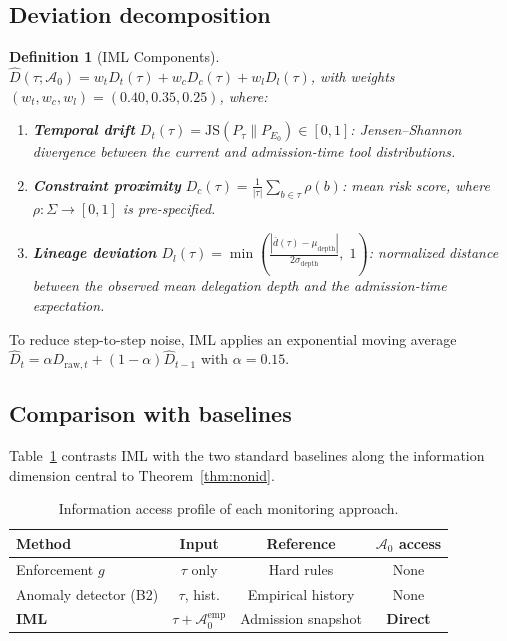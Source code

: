 \documentclass[11pt]{article}
\newtheorem{definition}{Definition}[section]
\newcommand{\Azero}{\mathcal{A}_0}
\newcommand{\Dhat}{\widehat{D}}
\newcommand{\JS}{\mathrm{JS}}
\begin{document}
\subsection{Deviation decomposition}

\begin{definition}[IML Components]
\label{def:components}
$\Dhat(\tau; \Azero) = w_t D_t(\tau) + w_c D_c(\tau) + w_l D_l(\tau)$,
with weights $(w_t, w_c, w_l) = (0.40, 0.35, 0.25)$, where:
\begin{enumerate}[label=\textup{(\arabic*)}, nosep, leftmargin=2em]
  \item \textbf{Temporal drift}
        $D_t(\tau) = \JS(P_\tau \| P_{E_0}) \in [0,1]$:
        Jensen--Shannon divergence between the current and admission-time
        tool distributions.
  \item \textbf{Constraint proximity}
        $D_c(\tau) = \frac{1}{|\tau|}\sum_{b \in \tau} \rho(b)$:
        mean risk score, where $\rho : \Sigma \to [0,1]$ is pre-specified.
  \item \textbf{Lineage deviation}
        $D_l(\tau) = \min\!\left(\tfrac{|\bar{d}(\tau) -
        \mu_{\mathrm{depth}}|}{2\sigma_{\mathrm{depth}}},\; 1\right)$:
        normalized distance between the observed mean delegation depth and
        the admission-time expectation.
\end{enumerate}
\end{definition}

To reduce step-to-step noise, IML applies an exponential moving average
$\Dhat_t = \alpha D_{\mathrm{raw},t} + (1-\alpha)\Dhat_{t-1}$ with
$\alpha = 0.15$.

\subsection{Comparison with baselines}

Table~\ref{tab:comparison} contrasts IML with the two standard baselines
along the information dimension central to Theorem~\ref{thm:nonid}.

\begin{table}[h]
\centering
\caption{Information access profile of each monitoring approach.}
\label{tab:comparison}
\small
\begin{tabular}{@{}lccc@{}}
\toprule
Method & Input & Reference & $\Azero$ access \\
\midrule
Enforcement $g$        & $\tau$ only   & Hard rules        & None \\
Anomaly detector (B2)  & $\tau$, hist. & Empirical history & None \\
\textbf{IML}           & $\tau + \Azero^{\mathrm{emp}}$
                       & Admission snapshot & \textbf{Direct} \\
\bottomrule
\end{tabular}
\end{table}
\end{document}
